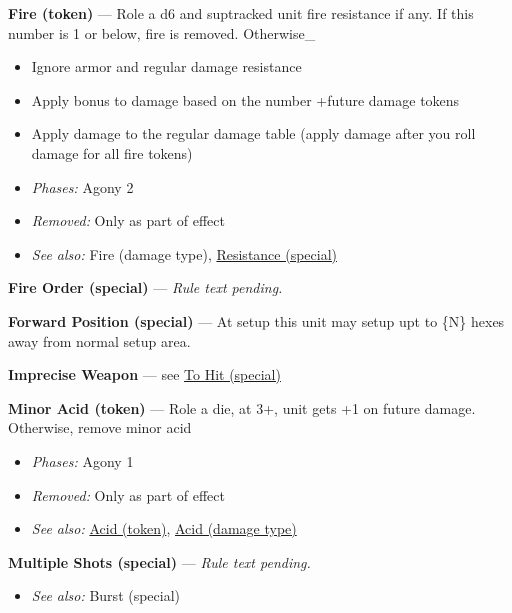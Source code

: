 \documentclass[a4paper,12pt]{article}
\begin{document}
\label{rule-token-fire}%
\noindent\textbf{Fire (token)} --- Role a d6 and suptracked unit fire resistance if any. If this number is 1 or below, fire is removed. Otherwise\_
\begin{itemize}
\item Ignore armor and regular damage resistance
\item Apply bonus to damage based on the number +future damage tokens
\item Apply damage to the regular damage table  (apply damage after you roll damage for all fire tokens)
\end{itemize}
\begin{itemize}
\item \textit{Phases:} Agony 2
\item \textit{Removed:} Only as part of effect
\item \textit{See also:} Fire (damage type), \hyperref[rule-special-resistance]{Resistance (special)}
\end{itemize}


\label{rule-special-fire-order}%
\noindent\textbf{Fire Order (special)} --- \textit{Rule text pending.}

\label{rule-special-forward-position}%
\noindent\textbf{Forward Position (special)} --- At setup this unit may setup upt to \{N\} hexes away from normal setup area.


\label{rule-alias-imprecise-weapon}%
\noindent\textbf{Imprecise Weapon} --- see \hyperref[rule-special-to-hit]{To Hit (special)}

\label{rule-token-minor-acid}%
\noindent\textbf{Minor Acid (token)} --- Role a die, at 3+, unit gets +1 on future damage. Otherwise, remove minor acid
\begin{itemize}
\item \textit{Phases:} Agony 1
\item \textit{Removed:} Only as part of effect
\item \textit{See also:} \hyperref[rule-token-acid]{Acid (token)}, \hyperref[rule-damage-type-acid]{Acid (damage type)}
\end{itemize}


\label{rule-special-multiple-shots}%
\noindent\textbf{Multiple Shots (special)} --- \textit{Rule text pending.}\begin{itemize}
\item \textit{See also:} Burst (special)
\end{itemize}
\end{document}

